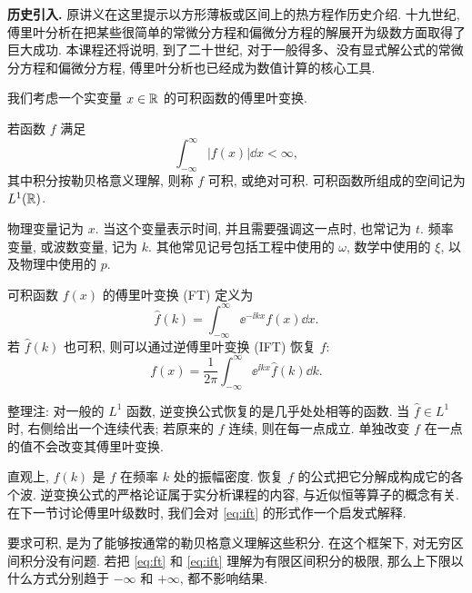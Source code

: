 \label{chap:fourier}

\textbf{历史引入.} 原讲义在这里提示以方形薄板或区间上的热方程作历史介绍. 十九世纪, 傅里叶分析在把某些很简单的常微分方程和偏微分方程的解展开为级数方面取得了巨大成功. 本课程还将说明, 到了二十世纪, 对于一般得多、没有显式解公式的常微分方程和偏微分方程, 傅里叶分析也已经成为数值计算的核心工具.

\label{sec:fourier-transform}
我们考虑一个实变量 $x\in\mathbb R$ 的可积函数的傅里叶变换.

\begin{definition}[可积性]
若函数 $f$ 满足
\[
\int_{-\infty}^{\infty}|f(x)|\dd x<\infty,
\]
其中积分按勒贝格意义理解, 则称 $f$ 可积, 或绝对可积. 可积函数所组成的空间记为 $L^1(\mathbb R)$.
\end{definition}

物理变量记为 $x$. 当这个变量表示时间, 并且需要强调这一点时, 也常记为 $t$. 频率变量, 或波数变量, 记为 $k$. 其他常见记号包括工程中使用的 $\omega$, 数学中使用的 $\xi$, 以及物理中使用的 $p$.

\begin{definition}[傅里叶变换]
可积函数 $f(x)$ 的傅里叶变换 (FT) 定义为
\begin{equation}\label{eq:ft}
\widehat f(k)=\int_{-\infty}^{\infty}\ee^{-\ii kx}f(x)\dd x.
\end{equation}
若 $\widehat f(k)$ 也可积, 则可以通过逆傅里叶变换 (IFT) 恢复 $f$:
\begin{equation}\label{eq:ift}
f(x)=\frac1{2\pi}\int_{-\infty}^{\infty}\ee^{\ii kx}\widehat f(k)\dd k.
\end{equation}
\end{definition}
\begin{remark}
整理注: 对一般的 $L^1$ 函数, 逆变换公式恢复的是几乎处处相等的函数. 当 $\widehat f\in L^1$ 时, 右侧给出一个连续代表; 若原来的 $f$ 连续, 则在每一点成立. 单独改变 $f$ 在一点的值不会改变其傅里叶变换.
\end{remark}

直观上, $\widehat f(k)$ 是 $f$ 在频率 $k$ 处的振幅密度. 恢复 $f$ 的公式把它分解成构成它的各个波. 逆变换公式的严格论证属于实分析课程的内容, 与近似恒等算子的概念有关. 在下一节讨论傅里叶级数时, 我们会对 \eqref{eq:ift} 的形式作一个启发式解释.

要求可积, 是为了能够按通常的勒贝格意义理解这些积分. 在这个框架下, 对无穷区间积分没有问题. 若把 \eqref{eq:ft} 和 \eqref{eq:ift} 理解为有限区间积分的极限, 那么上下限以什么方式分别趋于 $-\infty$ 和 $+\infty$, 都不影响结果.

